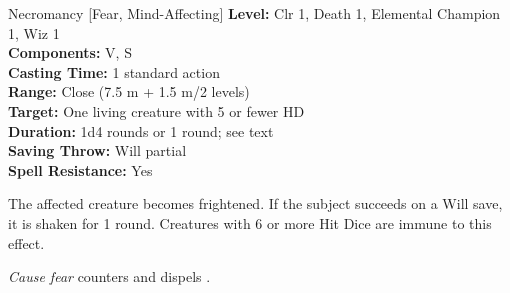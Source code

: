 {Necromancy [Fear, Mind-Affecting]}
{
	\textbf{Level:}
	Clr 1, Death 1, Elemental Champion 1, Wiz 1\\
	\textbf{Components:}
	V, S\\
	\textbf{Casting Time:}
	1 standard action\\
	\textbf{Range:}
	Close (7.5 m + 1.5 m/2 levels)\\
	\textbf{Target:}
	One living creature with 5 or fewer HD\\
	\textbf{Duration:}
	1d4 rounds or 1 round; see text\\
	\textbf{Saving Throw:}
	Will partial\\
	\textbf{Spell Resistance:}
	Yes\\
}
{
	The affected creature becomes frightened. If the subject succeeds on a Will save, it is shaken for 1 round. Creatures with 6 or more Hit Dice are immune to this effect.

	\emph{Cause fear} counters and dispels .

}

